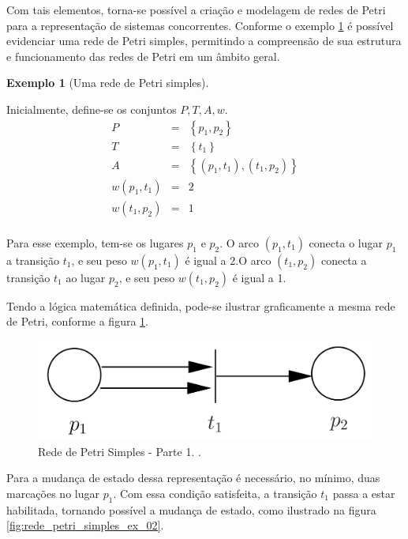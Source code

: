 \documentclass[
	12pt,				%
	openright,			%
	oneside,			%
	a4paper,			%
	english,			%
	brazil				%
	]{abntex2}
\newtheorem{exemplo}{Exemplo}
\begin{document}
Com tais elementos, torna-se possível a criação e modelagem de redes de Petri para a representação de sistemas concorrentes. Conforme o exemplo \ref{exemplo_rede_petri_simples} é possível evidenciar uma rede de Petri simples, permitindo a compreensão de sua estrutura e funcionamento das redes de Petri em um âmbito geral.

\begin{exemplo}[Uma rede de Petri simples] \label{exemplo_rede_petri_simples} 
\end{exemplo}
Inicialmente, define-se os conjuntos $P, T, A, w$. 
\begin{eqnarray*}
P &=& \left \{ p_{1},p_{2}\right \} \\
T &=& \left \{ t_{1}\right \} \\
A &=& \left \{ \left (p_{1},t_{1}\right ),\left (t_{1},p_{2}\right ) \right \} \\
w\left ( p_{1},t_{1} \right ) &=& 2 \\
w\left ( t_{1},p_{2} \right ) &=& 1 \\
\end{eqnarray*}


Para esse exemplo, tem-se os lugares $p_{1}$ e $p_{2}$. O arco $\left ( p_{1},t_{1} \right )$ conecta o lugar $p_{1}$ a transição $t_{1}$, e seu peso $w\left ( p_{1},t_{1} \right )$ é igual a 2.O arco $\left ( t_{1},p_{2} \right )$ conecta a transição  $t_{1}$ ao lugar $p_{2}$, e seu peso $w\left ( t_{1},p_{2} \right )$ é igual a 1. 

Tendo a lógica matemática definida, pode-se ilustrar graficamente a mesma rede de Petri, conforme a figura \ref{fig:rede_petri_simples_ex_01}.

\begin{figure}[ht] 
	\centering
	\includegraphics[scale=0.3]{exemplo_simples_rede_petri.png}
	\caption[Rede de Petri Simples - Parte 1]{Rede de Petri Simples - Parte 1. \textcite{CassandrasLafortune08}.}
	\label{fig:rede_petri_simples_ex_01}
\end{figure} 

Para a mudança de estado dessa representação é necessário, no mínimo, duas marcações no lugar $p_{1}$. Com essa condição satisfeita, a transição $t_{1}$ passa a estar habilitada, tornando possível a mudança de estado, como ilustrado na figura \ref{fig:rede_petri_simples_ex_02}.
\end{document}
